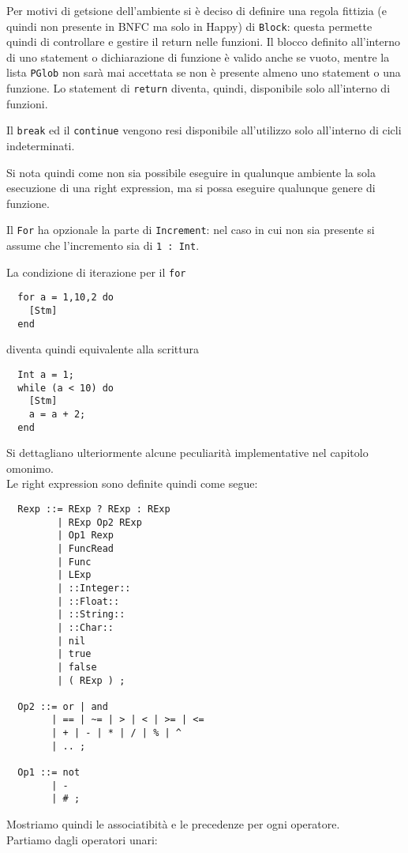 \documentclass{article}
\begin{document}
Per motivi di getsione dell'ambiente si è deciso di definire una regola fittizia (e quindi non presente in BNFC ma solo
in Happy) di \texttt{Block}: questa permette quindi di controllare e gestire il return nelle funzioni. Il blocco definito
all'interno di uno statement o dichiarazione di funzione è valido anche se vuoto, mentre la lista \texttt{PGlob} non sarà
mai accettata se non è presente almeno uno statement o una funzione. Lo statement di \texttt{return} diventa, quindi, 
disponibile solo all'interno di funzioni.

Il \texttt{break} ed il \texttt{continue} vengono resi disponibile all'utilizzo solo all'interno di cicli indeterminati.

Si nota quindi come non sia possibile eseguire in qualunque ambiente la sola esecuzione di una right expression, ma si
possa eseguire qualunque genere di funzione.

Il \texttt{For} ha opzionale la parte di \texttt{Increment}: nel caso in cui non sia presente si assume che l'incremento
sia di \texttt{1 : Int}.

La condizione di iterazione per il \texttt{for}
\begin{verbatim}
  for a = 1,10,2 do
    [Stm]
  end
\end{verbatim}
diventa quindi equivalente alla scrittura
\begin{verbatim}
  Int a = 1;  
  while (a < 10) do
    [Stm]
    a = a + 2;
  end
\end{verbatim}

Si dettagliano ulteriormente alcune peculiarità implementative nel capitolo omonimo.
~\\

Le right expression sono definite quindi come segue:
\begin{verbatim}
  Rexp ::= RExp ? RExp : RExp
         | RExp Op2 RExp
         | Op1 Rexp
         | FuncRead
         | Func         
         | LExp
         | ::Integer::
         | ::Float::
         | ::String::
         | ::Char::
         | nil
         | true
         | false
         | ( RExp ) ;
         
  Op2 ::= or | and
        | == | ~= | > | < | >= | <=
        | + | - | * | / | % | ^
        | .. ;
  
  Op1 ::= not
        | -
        | # ; 
\end{verbatim}

Mostriamo quindi le associatibità e le precedenze per ogni operatore.\\
Partiamo dagli operatori unari:
\end{document}
